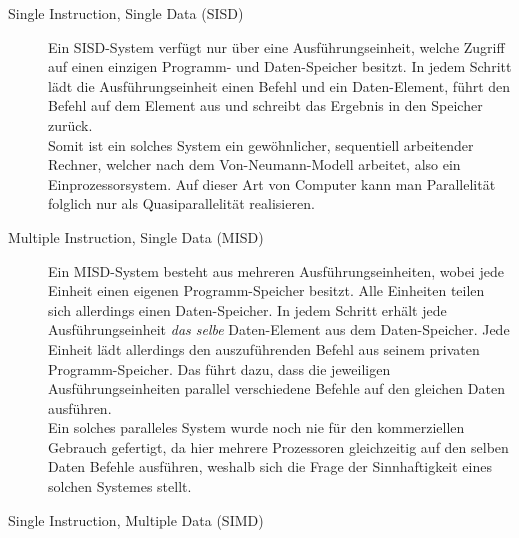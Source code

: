 				\begin{description}
					
					\item [Single Instruction, Single Data (SISD)]
					
						Ein SISD-System verfügt nur über eine Ausführungseinheit, welche Zugriff auf einen einzigen Programm- und Daten-Speicher besitzt. In jedem Schritt lädt die Ausführungseinheit einen Befehl und ein Daten-Element, führt den Befehl auf dem Element aus und schreibt das Ergebnis in den Speicher zurück.\\
						Somit ist ein solches System ein gewöhnlicher, sequentiell arbeitender Rechner, welcher nach dem Von-Neumann-Modell arbeitet, also ein Einprozessorsystem. Auf dieser Art von Computer kann man Parallelität folglich nur als Quasiparallelität realisieren. \cite{ParaProgRauber} \cite{FlynnscheKlassifikationWikipedia} \cite{EntwicklungParallelerProgramme}
						
					\item [Multiple Instruction, Single Data (MISD)]
					
						Ein MISD-System besteht aus mehreren Ausführungseinheiten, wobei jede Einheit einen eigenen Programm-Speicher besitzt. Alle Einheiten teilen sich allerdings einen Daten-Speicher. In jedem Schritt erhält jede Ausführungseinheit \textit{das selbe} Daten-Element aus dem Daten-Speicher. Jede Einheit lädt allerdings den auszuführenden Befehl aus seinem privaten Programm-Speicher. Das führt dazu, dass die jeweiligen Ausführungseinheiten parallel verschiedene Befehle auf den gleichen Daten ausführen.\\
						Ein solches paralleles System wurde noch nie für den kommerziellen Gebrauch gefertigt, da hier mehrere Prozessoren gleichzeitig auf den selben Daten Befehle ausführen, weshalb sich die Frage der Sinnhaftigkeit eines solchen Systemes stellt. \cite{ParaProgRauber} \cite{FlynnscheKlassifikationWikipedia} \cite{EntwicklungParallelerProgramme}
					
					\item [Single Instruction, Multiple Data (SIMD)]
					

\end{description}
